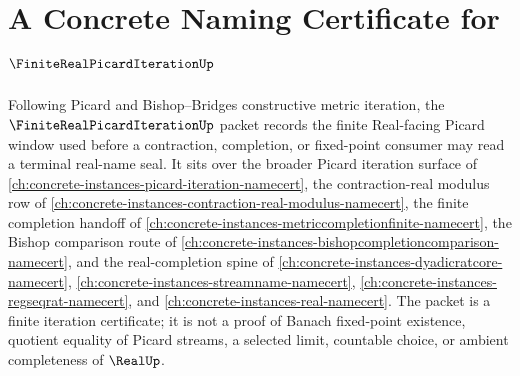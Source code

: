 \chapter{A Concrete Naming Certificate for $\FiniteRealPicardIterationUp$}
\label{ch:concrete-instances-finite-real-picard-iteration-namecert}

Following Picard and Bishop--Bridges constructive metric iteration, the $\FiniteRealPicardIterationUp$ packet records the finite Real-facing Picard window used before a contraction, completion, or fixed-point consumer may read a terminal real-name seal. It sits over the broader Picard iteration surface of \autoref{ch:concrete-instances-picard-iteration-namecert}, the contraction-real modulus row of \autoref{ch:concrete-instances-contraction-real-modulus-namecert}, the finite completion handoff of \autoref{ch:concrete-instances-metriccompletionfinite-namecert}, the Bishop comparison route of \autoref{ch:concrete-instances-bishopcompletioncomparison-namecert}, and the real-completion spine of \autoref{ch:concrete-instances-dyadicratcore-namecert}, \autoref{ch:concrete-instances-streamname-namecert}, \autoref{ch:concrete-instances-regseqrat-namecert}, and \autoref{ch:concrete-instances-real-namecert}. The packet is a finite iteration certificate; it is not a proof of Banach fixed-point existence, quotient equality of Picard streams, a selected limit, countable choice, or ambient completeness of $\RealUp$.

